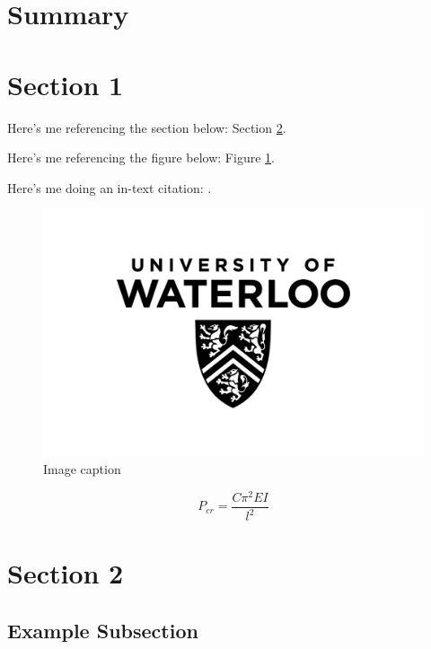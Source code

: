 \documentclass[12pt,letterpaper]{article}
\begin{document}
  
  
  \clearpage
  \tableofcontents{}\setcounter{page}{1}
  \clearpage
  \listoffigures
  \clearpage
  \listoftables
  \clearpage
  \section*{Summary}
  \clearpage
  \section{Section 1}
    Here's me referencing the section below: Section \ref{sec:section2}.

    Here's me referencing the figure below: Figure \ref{fig:figurelabel}.
    
    Here's me doing an in-text citation: \cite{example}.
    \begin{figure}[h!]
      \centering
      \includegraphics[width=0.7\linewidth]{uwlogo.jpg} %
      \caption{Image caption}
      \label{fig:figurelabel}
    \end{figure}

    \begin{equation*} %
      P_{cr}=\frac{C\pi^{2}EI}{l^{2}}
    \end{equation*}
    
  \section{Section 2}
    \label{sec:section2}
  \subsection{Example Subsection}
\end{document}

